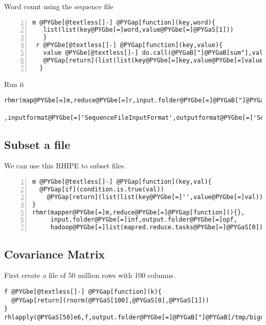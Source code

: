 \documentclass[letterpaper,10pt,english]{manual}
\begin{document}
Word count using the sequence file

\begin{Verbatim}[commandchars=@\[\],numbers=left,firstnumber=1,stepnumber=1]
m @PYGbe[@textless[]-] @PYGap[function](key,word){
   list(list(key@PYGbe[=]word,value@PYGbe[=]@PYGaS[1]))
   }
 r @PYGbe[@textless[]-] @PYGap[function](key,value){
   value @PYGbe[@textless[]-] do.call(@PYGaB["]@PYGaB[sum"],value)
   @PYGap[return](list(list(key@PYGbe[=]key,value@PYGbe[=]value)))
  }
\end{Verbatim}

Run it

\begin{Verbatim}[commandchars=@\[\]]
rhmr(map@PYGbe[=]m,reduce@PYGbe[=]r,input.folder@PYGbe[=]@PYGaB["]@PYGaB[/tmp/words"],output.folder@PYGbe[=]'@PYGbe[/]tmp@PYGbe[/]words.cnt'
   ,inputformat@PYGbe[=]'SequenceFileInputFormat',outputformat@PYGbe[=]'SequenceFileOutputFormat')
\end{Verbatim}


\subsection{Subset a file}

We can use this RHIPE to subset files.

\begin{Verbatim}[commandchars=@\[\],numbers=left,firstnumber=1,stepnumber=1]
m @PYGbe[@textless[]-] @PYGap[function](key,val){
  @PYGap[if](condition.is.true(val))
    @PYGap[return](list(list(key@PYGbe[=]'',value@PYGbe[=]val)))
}
rhmr(mapper@PYGbe[=]m,reduce@PYGbe[=]@PYGap[function](){},
     input.folder@PYGbe[=]inf,output.folder@PYGbe[=]opf,
     hadoop@PYGbe[=]list(mapred.reduce.tasks@PYGbe[=]@PYGaS[0]))
\end{Verbatim}


\subsection{Covariance Matrix}

First create a file of 50 million rows with 100 columns.

\begin{Verbatim}[commandchars=@\[\]]
f @PYGbe[@textless[]-] @PYGap[function](k){
  @PYGap[return](rnorm(@PYGaS[100],@PYGaS[0],@PYGaS[1]))
}
rhlapply(@PYGaS[50]e6,f,output.folder@PYGbe[=]@PYGaB["]@PYGaB[/tmp/bigd"],takeAll@PYGbe[=]F)
\end{Verbatim}
\end{document}
